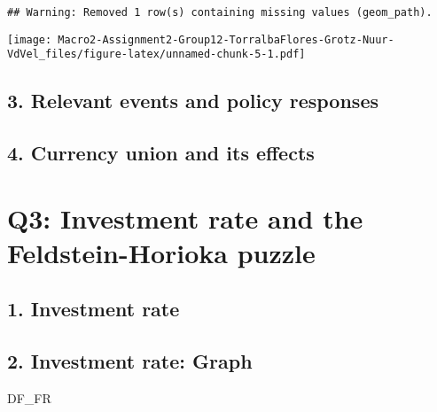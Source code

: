 \documentclass[
]{article}
\newenvironment{Shaded}{\begin{snugshade}}{\end{snugshade}}
\newcommand{\NormalTok}[1]{#1}
\begin{document}
\begin{verbatim}
## Warning: Removed 1 row(s) containing missing values (geom_path).
\end{verbatim}

\texttt{[image: Macro2-Assignment2-Group12-TorralbaFlores-Grotz-Nuur-VdVel\_files/figure-latex/unnamed-chunk-5-1.pdf]}

\hypertarget{relevant-events-and-policy-responses}{%
\subsection{3. Relevant events and policy
responses}\label{relevant-events-and-policy-responses}}

\hypertarget{currency-union-and-its-effects}{%
\subsection{4. Currency union and its
effects}\label{currency-union-and-its-effects}}

\hypertarget{q3-investment-rate-and-the-feldstein-horioka-puzzle}{%
\section{Q3: Investment rate and the Feldstein-Horioka
puzzle}\label{q3-investment-rate-and-the-feldstein-horioka-puzzle}}

\hypertarget{investment-rate}{%
\subsection{1. Investment rate}\label{investment-rate}}

\hypertarget{investment-rate-graph}{%
\subsection{2. Investment rate: Graph}\label{investment-rate-graph}}

\begin{Shaded}
\begin{Highlighting}[]
\NormalTok{DF\_FR}
\end{Highlighting}
\end{Shaded}
\end{document}
